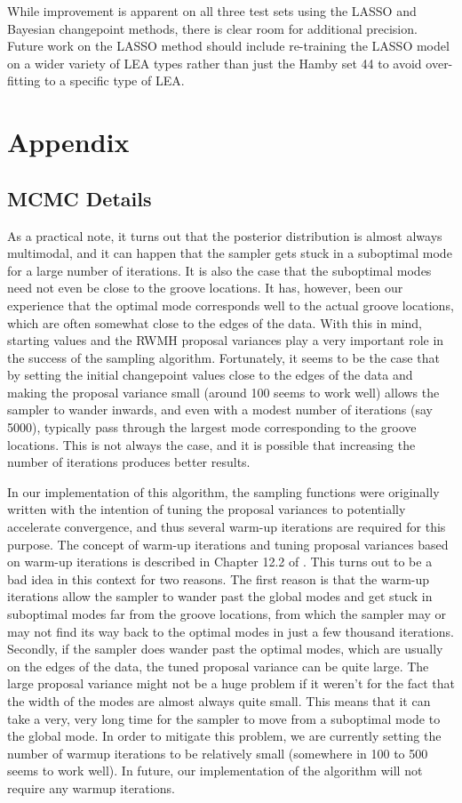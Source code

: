 \documentclass[12pt]{article}
\begin{document}
While improvement is apparent on all three test sets using the LASSO and
Bayesian changepoint methods, there is clear room for additional
precision. Future work on the LASSO method should include re-training
the LASSO model on a wider variety of LEA types rather than just the
Hamby set 44 to avoid over-fitting to a specific type of LEA.

\section{Appendix}

\subsection{MCMC Details}

As a practical note, it turns out that the posterior distribution is
almost always multimodal, and it can happen that the sampler gets stuck
in a suboptimal mode for a large number of iterations. It is also the
case that the suboptimal modes need not even be close to the groove
locations. It has, however, been our experience that the optimal mode
corresponds well to the actual groove locations, which are often
somewhat close to the edges of the data. With this in mind, starting
values and the RWMH proposal variances play a very important role in the
success of the sampling algorithm. Fortunately, it seems to be the case
that by setting the initial changepoint values close to the edges of the
data and making the proposal variance small (around 100 seems to work
well) allows the sampler to wander inwards, and even with a modest
number of iterations (say 5000), typically pass through the largest mode
corresponding to the groove locations. This is not always the case, and
it is possible that increasing the number of iterations produces better
results.

In our implementation of this algorithm, the sampling functions were
originally written with the intention of tuning the proposal variances
to potentially accelerate convergence, and thus several warm-up
iterations are required for this purpose. The concept of warm-up
iterations and tuning proposal variances based on warm-up iterations is
described in Chapter 12.2 of \citet{gelman2013}. This turns out to be a
bad idea in this context for two reasons. The first reason is that the
warm-up iterations allow the sampler to wander past the global modes and
get stuck in suboptimal modes far from the groove locations, from which
the sampler may or may not find its way back to the optimal modes in
just a few thousand iterations. Secondly, if the sampler does wander
past the optimal modes, which are usually on the edges of the data, the
tuned proposal variance can be quite large. The large proposal variance
might not be a huge problem if it weren't for the fact that the width of
the modes are almost always quite small. This means that it can take a
very, very long time for the sampler to move from a suboptimal mode to
the global mode. In order to mitigate this problem, we are currently
setting the number of warmup iterations to be relatively small
(somewhere in 100 to 500 seems to work well). In future, our
implementation of the algorithm will not require any warmup iterations.
\end{document}
